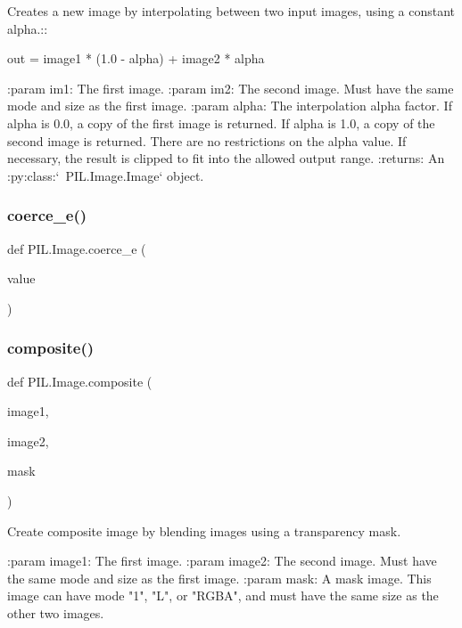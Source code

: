 \begin{DoxyVerb}Creates a new image by interpolating between two input images, using
a constant alpha.::

    out = image1 * (1.0 - alpha) + image2 * alpha

:param im1: The first image.
:param im2: The second image.  Must have the same mode and size as
   the first image.
:param alpha: The interpolation alpha factor.  If alpha is 0.0, a
   copy of the first image is returned. If alpha is 1.0, a copy of
   the second image is returned. There are no restrictions on the
   alpha value. If necessary, the result is clipped to fit into
   the allowed output range.
:returns: An :py:class:`~PIL.Image.Image` object.
\end{DoxyVerb}
 \mbox{\label{namespacePIL_1_1Image_a07a4e23826643b255b2ba585e84c04ec}} 
\subsubsection{\texorpdfstring{coerce\+\_\+e()}{coerce\_e()}}
{\footnotesize\ttfamily def P\+I\+L.\+Image.\+coerce\+\_\+e (\begin{DoxyParamCaption}\item[{}]{value }\end{DoxyParamCaption})}

\mbox{\label{namespacePIL_1_1Image_a98814f9f03151be0baf6094694f62649}} 
\subsubsection{\texorpdfstring{composite()}{composite()}}
{\footnotesize\ttfamily def P\+I\+L.\+Image.\+composite (\begin{DoxyParamCaption}\item[{}]{image1,  }\item[{}]{image2,  }\item[{}]{mask }\end{DoxyParamCaption})}

\begin{DoxyVerb}Create composite image by blending images using a transparency mask.

:param image1: The first image.
:param image2: The second image.  Must have the same mode and
   size as the first image.
:param mask: A mask image.  This image can have mode
   "1", "L", or "RGBA", and must have the same size as the
   other two images.
\end{DoxyVerb}
 \mbox{\label{namespacePIL_1_1Image_a0af0bdfd95c3adf70d21749bae884e91}} 
